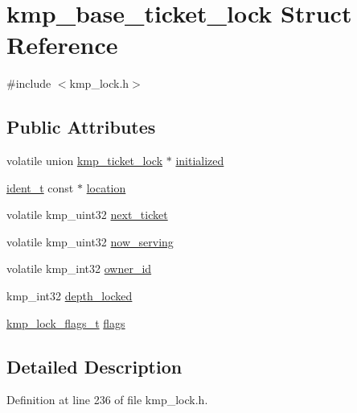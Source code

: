 \hypertarget{structkmp__base__ticket__lock}{\section{kmp\-\_\-base\-\_\-ticket\-\_\-lock Struct Reference}
\label{structkmp__base__ticket__lock}
}


{\ttfamily \#include $<$kmp\-\_\-lock.\-h$>$}

\subsection*{Public Attributes}
\begin{DoxyCompactItemize}
\item 
volatile union \hyperlink{unionkmp__ticket__lock}{kmp\-\_\-ticket\-\_\-lock} $\ast$ \hyperlink{structkmp__base__ticket__lock_a2dc1ea0be551259b6aa4854628562e0d}{initialized}
\item 
\hyperlink{group__BASIC__TYPES_ga690fda6b92f039a72db263c6b4394ddb}{ident\-\_\-t} const $\ast$ \hyperlink{structkmp__base__ticket__lock_a0dba998d5ca5ad3494098a70ee5d067e}{location}
\item 
volatile kmp\-\_\-uint32 \hyperlink{structkmp__base__ticket__lock_a5d8979535f7e42b2ab96100564315a98}{next\-\_\-ticket}
\item 
volatile kmp\-\_\-uint32 \hyperlink{structkmp__base__ticket__lock_af2e1b640be5026e8bbe7b1ed7d1b341e}{now\-\_\-serving}
\item 
volatile kmp\-\_\-int32 \hyperlink{structkmp__base__ticket__lock_a24b62af42d72540c62cfbca970895539}{owner\-\_\-id}
\item 
kmp\-\_\-int32 \hyperlink{structkmp__base__ticket__lock_a647923086ea397dda0c5d9351cb16835}{depth\-\_\-locked}
\item 
\hyperlink{kmp__lock_8h_aa9a2d4f195809e8574655b5eda034db7}{kmp\-\_\-lock\-\_\-flags\-\_\-t} \hyperlink{structkmp__base__ticket__lock_a2de50496ac13d01017bc079a5bcf09ff}{flags}
\end{DoxyCompactItemize}


\subsection{Detailed Description}


Definition at line 236 of file kmp\-\_\-lock.\-h.



